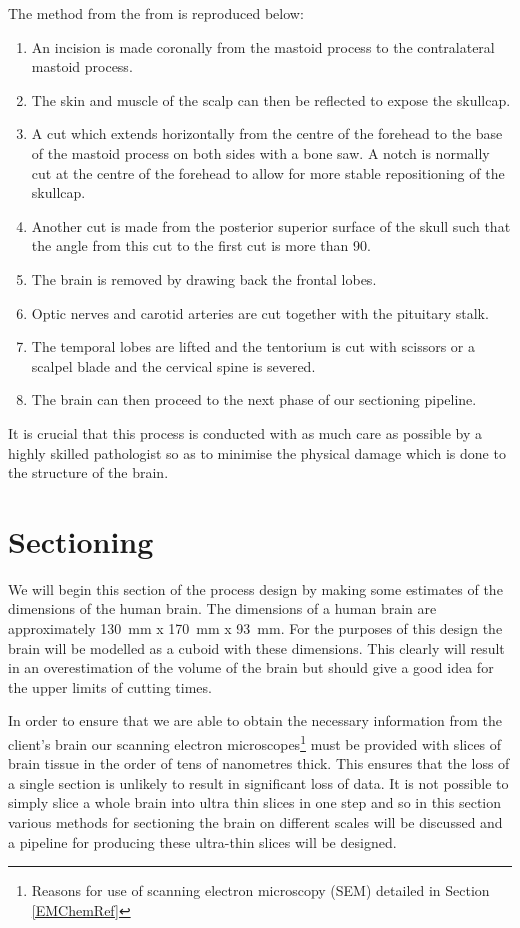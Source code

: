 \documentclass[a4paper, 11pt]{article}
\numberwithin{equation}{section}
\begin{document}
The method from the from \cite{autopsy} is reproduced below:
	\begin{enumerate}
		\item An incision is made coronally from the mastoid process to the contralateral mastoid process. 
		\item The skin and muscle of the scalp can then be reflected to expose the skullcap.
		\item A cut which extends horizontally from the centre of the forehead to the base of the mastoid process on both sides with a bone saw. A notch is normally cut at the centre of the forehead to allow for more stable repositioning of the skullcap.
		\item Another cut is made from the posterior superior surface of the skull such that the angle from this cut to the first cut is more than 90\textdegree.
		\item The brain is removed by drawing back the frontal lobes.
		\item Optic nerves and carotid arteries are cut together with the pituitary stalk.
		\item The temporal lobes are lifted and the tentorium is cut with scissors or a scalpel blade and the cervical spine is severed.
		\item The brain can then proceed to the next phase of our sectioning pipeline.
	\end{enumerate}
	
	It is crucial that this process is conducted with as much care as possible by a highly skilled pathologist so as to minimise the physical damage which is done to the structure of the brain.
	
	\newpage
	\section{Sectioning}
	\label{sectioning}
	
	We will begin this section of the process design by making some estimates of the dimensions of the human brain. The dimensions of a human brain are approximately \SI{130}{\milli\metre} x \SI{170}{\milli\metre} x \SI{93}{\milli\metre}\cite{hassanali2007comparative}. For the purposes of this design the brain will be modelled as a cuboid with these dimensions. This clearly will result in an overestimation of the volume of the brain but should give a good idea for the upper limits of cutting times.
	
	In order to ensure that we are able to obtain the necessary information from the client's brain our scanning electron microscopes\footnote{Reasons for use of scanning electron microscopy (SEM) detailed in Section \ref{EMChemRef}} must be provided with slices of brain tissue in the order of tens of nanometres thick. This ensures that the loss of a single section is unlikely to result in significant loss of data. It is not possible to simply slice a whole brain into ultra thin slices in one step and so in this section various methods for sectioning the brain on different scales will be discussed and a pipeline for producing these ultra-thin slices will be designed.
	
\end{document}

